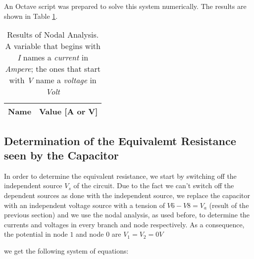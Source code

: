 \hfill


An Octave script was prepared to solve this system numerically. The results are shown in Table \ref{tab:op_tabNodal2}.


\begin{table}[b]
  \centering
  \begin{tabular}{|c|c}
    \hline
    {\bf Name} & {\bf Value [A or V]} \\ \hline
    
  \end{tabular}
  \caption{Results of Nodal Analysis. A variable that begins  with \textit{I} names a \textit{current} in \textit{Ampere}; the ones that start with \textit{V} name a \textit{voltage} in \textit{Volt} }
  \label{tab:op_tabNodal2}
\end{table}



\subsection{Determination of the Equivalemt Resistance seen by the Capacitor}

In order to determine the equivalent resistance, we start by switching off the independent source $V_s$ of the circuit. Due to the fact we can't switch off the dependent sources
as done with the independent source, we replace the capacitor with an independent voltage source with a tension of $V6-V8 = V_a$ (result of the previous section) and we use the nodal analysis, as used before,
to determine the currents and voltages in every branch and node respectively. As a consequence, the potential in node $1$ and node $0$ are $V_1 = V_2 = 0 V$

we get the following system of equations:

